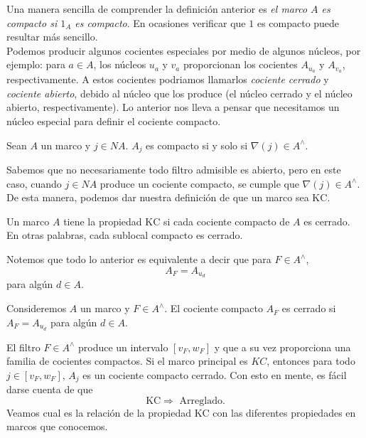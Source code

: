 Una manera sencilla de comprender la definición anterior es \emph{el marco $A$ es compacto si $1_A$ es compacto}. En ocasiones verificar que $1$ es compacto puede resultar más sencillo.\\

Podemos producir algunos cocientes especiales por medio de algunos núcleos, por ejemplo: para $a\in A$, los núcleos $u_a$ y $v_a$ proporcionan los cocientes $A_{u_a}$ y $A_{v_a}$, respectivamente. A estos cocientes podriamos llamarlos \emph{cociente cerrado} y \emph{cociente abierto}, debido al núcleo que los produce (el núcleo cerrado y el núcleo abierto, respectivamente). 
Lo anterior nos lleva a pensar que necesitamos un núcleo especial para definir el cociente compacto. 

\begin{prop}\label{cocientecompacto}
Sean $A$ un marco y $j\in NA$. $A_j$ es compacto si y solo si $\nabla(j)\in A^\wedge$.
\end{prop}

Sabemos que no necesariamente todo filtro admisible es abierto, pero en este caso, cuando $j\in NA$ produce un cociente compacto, se cumple que $\nabla(j)\in A^\wedge$.\\

De esta manera, podemos dar nuestra definición de que un marco sea $\mathrm{KC}$.

\begin{dfn}\label{KOMPACT}
	Un marco $A$ tiene la propiedad $\mathrm{KC}$ si cada cociente compacto de $A$ es cerrado. En otras palabras, cada sublocal compacto es cerrado.
\end{dfn}

Notemos que todo lo anterior es equivalente a decir que para $F\in A^\wedge$,
\[
A_F=A_{u_d}
\]
para algún $d\in A$.

\begin{dfn}\label{ccquotien}
    Consideremos $A$ un marco y $F\in A^\wedge$. El cociente compacto $A_F$ es cerrado si $A_F=A_{u_d}$ para algún $d\in A$.
\end{dfn}

El filtro $F\in A^\wedge$ produce un intervalo $[v_F, w_F]$ y que a su vez proporciona una familia de cocientes compactos. Si el marco principal es $KC$, entonces para todo $j\in [v_F, w_F]$, $A_j$ es un cociente compacto cerrado. Con esto en mente, es fácil darse cuenta de que 
\[
\mathrm{KC} \Rightarrow \mbox{ Arreglado}.
\]
Veamos cual es la relación de la propiedad $\mathrm{KC}$ con las diferentes propiedades en marcos que conocemos.\\

